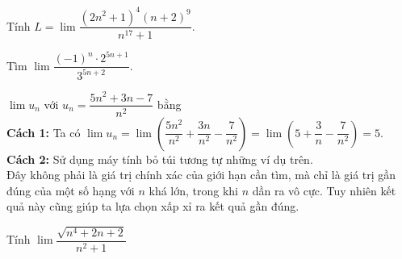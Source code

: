 \begin{ex}%
	Tính $L=\lim  \dfrac{\left(2 n^{2}+1\right)^{4}(n+2)^{9}}{n^{17}+1}$.
\end{ex}

\begin{ex}%
	 Tìm $\lim\dfrac{\left(-1\right)^n\cdot {2^{5n+1}}}{3^{5n+2}}$.
\end{ex}

\begin{ex}%
	 $\lim u_n$ với $u_n=\dfrac{5n^2+3n-7}{n^2}$ bằng\\
	\textbf{Cách 1:} Ta có  $\lim u_n=\lim \left(\dfrac{5n^2}{n^2}+\dfrac{3n}{n^2}-\dfrac{7}{n^2} \right)=\lim \left(5+\dfrac{3}{n}-\dfrac{7}{n^2} \right)=5$.\\
	\textbf{Cách 2:} Sử dụng  máy tính bỏ túi tương tự những ví dụ trên.\\
	Đây không phải là giá trị chính xác của giới hạn cần tìm, mà chỉ là giá trị gần đúng của một số hạng với $n$ khá lớn, trong  khi $n$ dần ra vô cực. Tuy nhiên kết quả này cũng giúp ta lựa chọn xấp xỉ ra kết quả gần đúng.
\end{ex}

\begin{ex}%
	Tính $\lim \dfrac{\sqrt{n^{4}+2 n+2}}{n^{2}+1}$ 
\end{ex}

